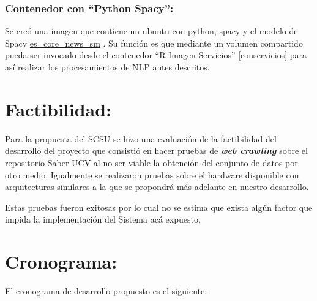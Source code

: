 \documentclass[
  10,
  spanish,
  openany]{book}
\begin{document}
\hypertarget{conspacy}{%
\subsubsection{Contenedor con ``Python Spacy'':}\label{conspacy}}

Se creó una imagen que contiene un ubuntu con python, spacy y el modelo de Spacy \href{https://spacy.io/models/es\#es_core_news_sm}{es\_core\_news\_sm} . Su función es que mediante un volumen compartido pueda ser invocado desde el contenedor ``R Imagen Servicios'' \ref{conservicios} para así realizar los procesamientos de NLP antes descritos.

\hypertarget{factibilidad}{%
\section{Factibilidad:}\label{factibilidad}}

Para la propuesta del SCSU se hizo una evaluación de la factibilidad del desarrollo del proyecto que consistió en hacer pruebas de \textbf{\emph{web crawling}} sobre el repositorio Saber UCV al no ser viable la obtención del conjunto de datos por otro medio. Igualmente se realizaron pruebas sobre el hardware disponible con arquitecturas similares a la que se propondrá más adelante en nuestro desarrollo.

Estas pruebas fueron exitosas por lo cual no se estima que exista algún factor que impida la implementación del Sistema acá expuesto.

\hypertarget{cronograma}{%
\section{Cronograma:}\label{cronograma}}

El cronograma de desarrollo propuesto es el siguiente:

\providecommand{\docline}[3]{\noalign{\global\setlength{\arrayrulewidth}{#1}}\arrayrulecolor[HTML]{#2}\cline{#3}}

\setlength{\tabcolsep}{2pt}

\renewcommand*{\arraystretch}{1.5}
\end{document}

